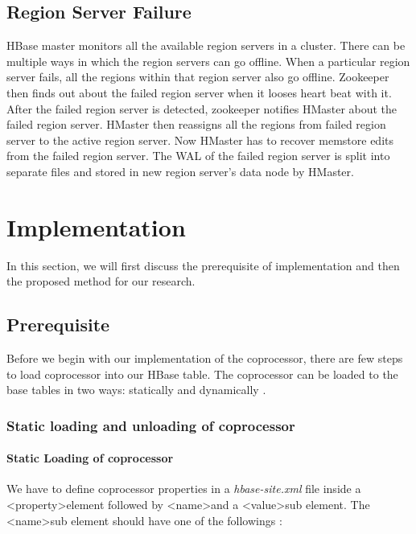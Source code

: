 \documentclass[11pt,a4paper,bibtotoc,idxtotoc,headsepline,footsepline,footexclude,BCOR12mm,DIV13]{scrbook}
\begin{document}
\section{Region Server Failure}
\label{Region Server Failure}
HBase master monitors all the available region servers in a cluster. There can be multiple ways in which the region servers can go offline. When a particular region server fails, all the regions within that region server also go offline. Zookeeper then finds out about the failed region server when it looses heart beat with it. After the failed region server is detected, zookeeper notifies HMaster about the failed region server. HMaster then reassigns all the regions from failed region server to the active region server. Now HMaster has to recover memstore edits from the failed region server. The WAL of the failed region server is split into separate files and stored in new region server's data node by HMaster.


\chapter{Implementation}
\label{Implementation}
In this section, we will first discuss the prerequisite of implementation and then the proposed method for our research.

\section{Prerequisite}
Before we begin with our implementation of the coprocessor, there are few steps to load coprocessor into our HBase table. The coprocessor can be loaded to the base tables in two ways: statically and dynamically \cite{hbase:site}. 

\subsection{Static loading and unloading of coprocessor}

\subsubsection{Static Loading of coprocessor}
We have to define coprocessor properties in a \emph{hbase-site.xml} file inside a \textless property\textgreater \space element followed by \textless name\textgreater \space and a \textless value\textgreater \space sub element. The \textless name\textgreater \space sub element should have one of the followings \cite{hbase:site}:
\end{document}
